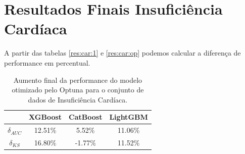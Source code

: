 \section{Resultados Finais Insuficiência Cardíaca}
A partir das tabelas \ref{res:car:1} e \ref{res:car:op} podemos calcular a diferença de performance em percentual.

\begin{table}[H]
\centering
\begin{tabular}{|c|c|c|c|}
\hline
	& \textbf{XGBoost} &\textbf{CatBoost} & \textbf{LightGBM} \\
\hline
$\delta_{AUC}$	& 12.51\%&	5.52\%	   &     11.06\% \\
\hline
$\delta_{KS}$	&    16.80\% 	&  -1.77\% &	11.52\%\\
\hline
\end{tabular}
\caption{Aumento final da performance do modelo otimizado pelo Optuna para o conjunto de dados de Insuficiência Cardíaca.}
\end{table}

